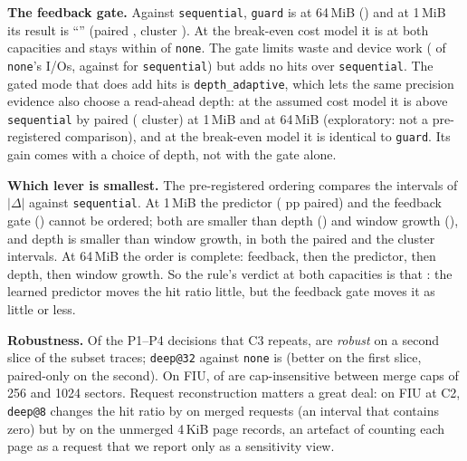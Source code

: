 \textbf{The feedback gate.} Against \texttt{sequential}, \texttt{guard} is
\decDiskPTwoGuardAssumedSixtyFourMiBVerdict{} at 64\,MiB
(\decDiskPTwoGuardAssumedSixtyFourMiBPairedCI) and at 1\,MiB its result is
``\decDiskPTwoGuardAssumedOneMiBVerdict'' (paired
\decDiskPTwoGuardAssumedOneMiBPairedCI, cluster
\decDiskPTwoGuardAssumedOneMiBClusterCI). At the break-even cost model it is
\decDiskPTwoGuardBreakEvenOneMiBVerdict{} at both capacities and stays within
\diskBreakEvenVsNoneGuardOneMiB{} of \texttt{none}. The gate limits waste and device
work (\diskIORatioGuardOneMiB{} of \texttt{none}'s I/Os, against
\diskIORatioSequentialOneMiB{} for \texttt{sequential}) but adds no hits over
\texttt{sequential}. The gated mode that does add hits is
\texttt{depth\_adaptive}, which lets the same precision evidence also choose a
read-ahead depth: at the assumed cost model it is above \texttt{sequential} by
\diskDeltaHitRatioDepthAdaptiveVsSequentialOneMiBCI{} paired
(\diskDeltaHitRatioDepthAdaptiveVsSequentialOneMiBClusterCI{} cluster) at
1\,MiB and \diskDeltaHitRatioDepthAdaptiveVsSequentialSixtyFourMiBCI{} at
64\,MiB (exploratory: not a pre-registered comparison), and at the break-even
model it is identical to \texttt{guard}. Its gain comes with a choice of depth,
not with the gate alone.

\textbf{Which lever is smallest.} The pre-registered ordering compares the
intervals of $|\Delta|$ against \texttt{sequential}. At 1\,MiB the predictor
(\decDiskOneMiBPredictorSmallestPredictorPairedCI{} pp paired) and the
feedback gate (\decDiskOneMiBPredictorSmallestFeedbackPairedCI) cannot be
ordered; both are smaller than depth
(\decDiskOneMiBPredictorSmallestDepthPairedCI) and window growth
(\decDiskOneMiBPredictorSmallestWindowGrowthPairedCI), and depth is smaller than
window growth, in both the paired and the cluster intervals. At 64\,MiB the
order is complete: feedback, then the predictor, then depth, then window
growth. So the rule's verdict at both capacities is that
\decDiskSixtyFourMiBPredictorSmallestVerdict: the learned predictor moves the
hit ratio little, but the feedback gate moves it as little or less.

\textbf{Robustness.} Of the \decTallyCThree{} P1--P4 decisions that C3 repeats,
\decTallyCThreeRobust{} are \emph{robust} on a second slice of the subset traces;
\texttt{deep@32} against \texttt{none} is
\decDiskCThreeDeepAtThirtyTwoAssumedVerdict{} (better on the first slice,
paired-only on the second). On FIU, \decTallyCFourCapInsensitive{} of
\decTallyCFour{} are cap-insensitive between merge caps of 256 and 1024
sectors. Request reconstruction matters a great deal: on FIU at C2,
\texttt{deep@8} changes the hit ratio by
\diskDeltaFiuCTwoHitRatioDeepAtEightVsNoneOneMiBCI{} on merged requests (an
interval that contains zero) but by
\diskDeltaFiuCTwoNoneHitRatioDeepAtEightVsNoneOneMiBCI{} on the unmerged
4\,KiB page records, an artefact of counting each page as a request that we
report only as a sensitivity view.

